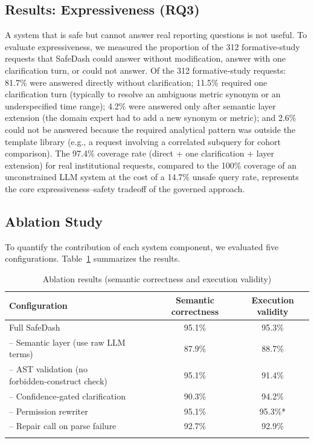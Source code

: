 \documentclass[11pt]{article}
\begin{document}
\subsection{Results: Expressiveness (RQ3)}
A system that is safe but cannot answer real reporting questions is not useful. To evaluate expressiveness, we measured the proportion of the 312 formative‑study requests that SafeDash could answer without modification, answer with one clarification turn, or could not answer. Of the 312 formative‑study requests: 81.7\% were answered directly without clarification; 11.5\% required one clarification turn (typically to resolve an ambiguous metric synonym or an underspecified time range); 4.2\% were answered only after semantic layer extension (the domain expert had to add a new synonym or metric); and 2.6\% could not be answered because the required analytical pattern was outside the template library (e.g., a request involving a correlated subquery for cohort comparison). The 97.4\% coverage rate (direct + one clarification + layer extension) for real institutional requests, compared to the 100\% coverage of an unconstrained LLM system at the cost of a 14.7\% unsafe query rate, represents the core expressiveness–safety tradeoff of the governed approach.

\subsection{Ablation Study}
To quantify the contribution of each system component, we evaluated five configurations. Table~\ref{tab:ablation} summarizes the results.

\begin{longtable}{lcc}
\toprule
\textbf{Configuration} & \textbf{Semantic correctness} & \textbf{Execution validity}\\
\midrule
Full SafeDash & 95.1\% & 95.3\%\\
– Semantic layer (use raw LLM terms) & 87.9\% & 88.7\%\\
– AST validation (no forbidden‑construct check) & 95.1\% & 91.4\%\\
– Confidence‑gated clarification & 90.3\% & 94.2\%\\
– Permission rewriter & 95.1\% & 95.3\%*\\
– Repair call on parse failure & 92.7\% & 92.9\%\\
\bottomrule
\caption{Ablation results (semantic correctness and execution validity)}\label{tab:ablation}
\end{longtable}
\end{document}
